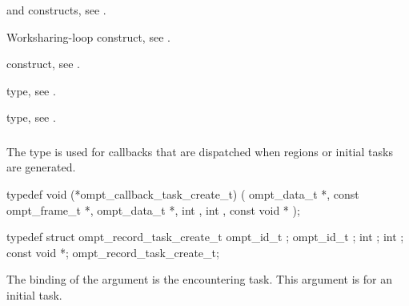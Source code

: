 \begin{crossrefs}
\item {} and  constructs, 
see .

\item Worksharing-loop construct, see .

\item {} construct, see .

\item {} type, see   .

\item {} type, see .
\end{crossrefs}



\subsubsection{}
\label{sec:ompt_callback_task_create_t}

\summary
The  type is used for callbacks that are 
dispatched when  regions or initial tasks are generated.

\format
\begin{ccppspecific}
\begin{omptCallback}
typedef void (*ompt_callback_task_create_t) (
  ompt_data_t *,
  const ompt_frame_t *,
  ompt_data_t *,
  int ,
  int ,
  const void *
);
\end{omptCallback}
\end{ccppspecific}

\record
\begin{ccppspecific}
\begin{omptRecord}
typedef struct ompt_record_task_create_t {
  ompt_id_t ;
  ompt_id_t ;
  int ;
  int ;
  const void *;
} ompt_record_task_create_t;
\end{omptRecord}
\end{ccppspecific}

\argdesc
The binding of the  argument is the encountering task.
This argument is  for an initial task.

